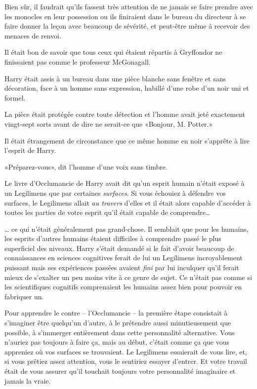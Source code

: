 Bien sûr, il faudrait qu'ils fassent très attention de ne jamais se faire prendre avec les monocles en leur possession ou ils finiraient dans le bureau du directeur à se faire donner la leçon avec beaucoup de sévérité, et peut-être même à recevoir des menaces de renvoi.

Il était bon de savoir que tous ceux qui étaient répartis à Gryffondor ne finissaient pas comme le professeur McGonagall.

\later

Harry était assis à un bureau dans une pièce blanche sans fenêtre et sans décoration, face à un homme sans expression, habillé d’une robe d'un noir uni et formel.

La pièce était protégée contre toute détection et l'homme avait jeté exactement vingt-sept sorts avant de dire ne serait-ce que «Bonjour, M. Potter.»

Il était étrangement de circonstance que ce même homme en noir s'apprête à lire l'esprit de Harry.

«Préparez-vous», dit l'homme d'une voix sans timbre.

Le livre d'Occlumancie de Harry avait dit qu'un esprit humain n'était exposé à un Legilimens que par certaines \emph{surfaces}. Si vous échouiez à défendre vos surfaces, le Legilimens allait \emph{au travers} d'elles et il était alors capable d'accéder à toutes les parties de votre esprit qu'il était capable de comprendre…

… ce qui n'était généralement pas grand-chose. Il semblait que pour les humains, les esprits d'autres humains étaient difficiles à comprendre passé le plus superficiel des niveaux. Harry s'était demandé si le fait d'avoir beaucoup de connaissances en sciences cognitives ferait de lui un Legilimens incroyablement puissant mais ses expériences passées avaient \emph{fini} par lui inculquer qu'il ferait mieux de s'exalter un peu moins vite à ce genre de sujet. Ce n'était pas comme si les scientifiques cognitifs comprenaient les humains assez bien pour pouvoir en fabriquer un.

Pour apprendre le contre -- l'Occlumancie -- la première étape consistait à s'imaginer être quelqu'un d'autre, à le prétendre aussi minutieusement que possible, à s'immerger entièrement dans cette personnalité alternative. Vous n'auriez pas toujours à faire ça, mais au début, c'était comme ça que vous appreniez où vos surfaces se trouvaient. Le Legilimens essaierait de vous lire, et, si vous prêtiez assez attention, vous le sentiriez essayer d'entrer. Et votre travail était de vous assurer qu'il touchait toujours votre personnalité imaginaire et jamais la vraie.

